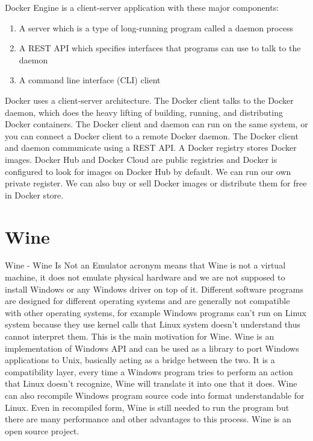 Docker Engine is a client-server application with these major components:
\begin{enumerate}
\item A server which is a type of long-running program called a daemon process
\item A REST API which specifies interfaces that programs can use to talk to the daemon
\item A command line interface (CLI) client
\end{enumerate}
Docker uses a client-server architecture. The Docker client talks to the Docker daemon, which does the heavy lifting of building, running, and distributing Docker containers. The Docker client and daemon can run on the same system, or you can connect a Docker client to a remote Docker daemon. The Docker client and daemon communicate using a REST API.
A Docker registry stores Docker images. Docker Hub and Docker Cloud are public registries and Docker is configured to look for images on Docker Hub by default. We can run our own private register. We can also buy or sell Docker images or distribute them for free in Docker store.


\section{Wine \cite{wine}}
Wine - Wine Is Not an Emulator acronym means that Wine is not a virtual machine, it does not emulate physical hardware and we are not supposed to install Windows or any Windows driver on top of it. Different software programs are designed for different operating systems and are generally not compatible with other operating systems, for example Windows programs can't run on Linux system because they use kernel calls that Linux system doesn't understand thus cannot interpret them. This is the main motivation for Wine. Wine is an implementation of Windows API and can be used as a library to port Windows applications to Unix, basically acting as a bridge between the two. It is a compatibility layer, every time a Windows program tries to perform an action that Linux doesn't recognize, Wine will translate it into one that it does. Wine can also recompile Windows program source code into format understandable for Linux. Even in recompiled form, Wine is still needed to run the program but there are many performance and other advantages to this process. Wine is an open source project.

